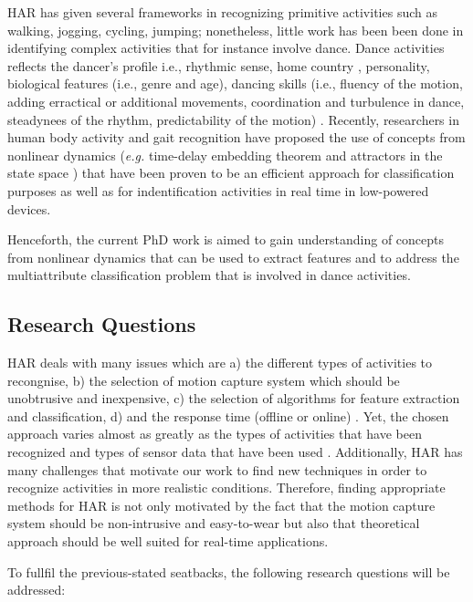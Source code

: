 \documentclass{sigchi}
\begin{document}
HAR has given several frameworks in recognizing primitive activities 
such as walking, jogging, cycling, jumping; nonetheless, little work has been been
done in identifying complex activities that for instance involve dance. 
Dance activities reflects the dancer's profile i.e., rhythmic sense, 
home country \cite{Iwai2011}, personality, biological features (i.e., genre and age),
dancing skills (i.e., fluency of the motion, adding erractical or additional movements,
coordination and turbulence in dance, steadynees of the rhythm, predictability of 
the motion) \cite{GrammerK.ElisabethOberzaucher2011}.
Recently, researchers in human body activity and gait recognition have proposed
the use of concepts from nonlinear dynamics (\textit{e.g.}
time-delay embedding theorem \cite{J.FrankS.Mannor2010,Sama2013}
and attractors in the state space \cite{Akiduki2013,Akiduki2014}) 
that have been proven to be an efficient approach 
for classification purposes as well as for indentification activities 
in real time in low-powered devices. 

Henceforth, the current PhD work is aimed to gain understanding of 
concepts from nonlinear dynamics that can be used to extract features and
to address the multiattribute classification problem that is involved 
in dance activities.

\subsection{Research Questions}
HAR deals with many issues which are
a) the different types of activities to recongnise,
b) the selection of motion capture system which should be unobtrusive and inexpensive,
c) the selection of algorithms for feature extraction and classification,
d) and the response time (offline or online) \cite{Lara2013}.
Yet, the chosen approach varies almost as greatly as the types of activities 
that have been recognized and types of sensor data that have been used 
\cite{Kim2010}. 
Additionally, HAR has many challenges that motivate our work 
to find new techniques in order to recognize activities in more realistic conditions. 
Therefore, finding appropriate methods for HAR is not only motivated by the 
fact that the motion capture system should be non-intrusive and easy-to-wear
but also that theoretical approach should be well suited for real-time applications.

To fullfil the previous-stated seatbacks, the following research questions will be addressed:
\end{document}
